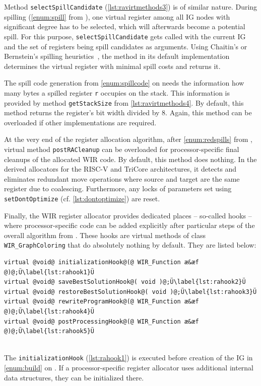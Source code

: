 Method \texttt{selectSpillCandidate} (\cref{lst:ravirtmethods3}) is of similar nature.
During spilling (\cref{enum:spill} from ), one virtual register among all \gls{IG} nodes with significant degree has to be selected, which will afterwards become a potential spill.
For this purpose, \texttt{selectSpillCandidate} gets called with the current \gls{IG} and the set of registers being spill candidates as arguments.
Using Chaitin's or Bernstein's spilling heuristics~\cite{Brig92,BGM+89}, the method in its default implementation determines the virtual register with minimal spill costs and returns it.

The spill code generation from \cref{enum:spillcode} on  needs the information how many bytes a spilled register \texttt{r} occupies on the stack.
This information is provided by method \texttt{getStackSize} from \cref{lst:ravirtmethods4}.
By default, this method returns the register's bit width divided by 8.
Again, this method can be overloaded if other implementations are required.

At the very end of the register allocation algorithm, after \cref{enum:redspills} from , virtual method \texttt{postRACleanup} can be overloaded for processor-specific final cleanups of the allocated \gls{WIR} code.
By default, this method does nothing.
In the derived allocators for the RISC-V and TriCore architectures, it detects and eliminates redundant move operations where source and target are the same register due to coalescing.
Furthermore, any locks of parameters set using \texttt{setDontOptimize} (cf. \cref{lst:dontoptimize}) are reset.

Finally, the \gls{WIR} register allocator provides dedicated places -- so-called hooks -- where processor-specific code can be added explicitly after particular steps of the overall algorithm from .
These hooks are virtual methods of class \texttt{WIR\_GraphColoring} that do absolutely nothing by default.
They are listed below: \\
\begin{lstlisting}[style=code,float=!ht,aboveskip=-0.8 \baselineskip,belowskip=-0.8 \baselineskip]
virtual @void@ initializationHook@(@ WIR_Function æ&æf @)@;Ü\label{lst:rahook1}Ü
virtual @void@ saveBestSolutionHook@( void )@;Ü\label{lst:rahook2}Ü
virtual @void@ restoreBestSolutionHook@( void )@;Ü\label{lst:rahook3}Ü
virtual @void@ rewriteProgramHook@(@ WIR_Function æ&æf @)@;Ü\label{lst:rahook4}Ü
virtual @void@ postProcessingHook@(@ WIR_Function æ&æf @)@;Ü\label{lst:rahook5}Ü
\end{lstlisting}
\\
The \texttt{initializationHook} (\cref{lst:rahook1}) is executed before creation of the \gls{IG} in \cref{enum:build} on .
If a processor-specific register allocator uses additional internal data structures, they can be initialized there.

